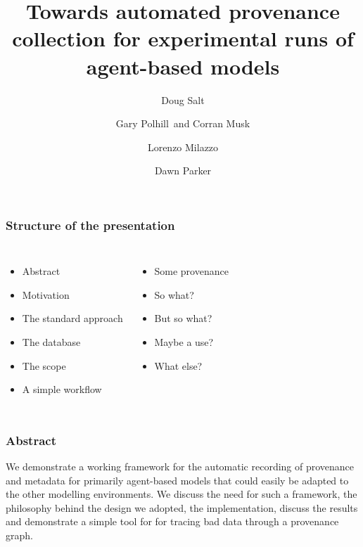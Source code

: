 \documentclass[usenames,dvipsnames,10pt]{beamer}
\title{Towards automated provenance collection for experimental runs of agent-based models}
\author{Doug Salt \and Gary Polhill\ and Corran Musk \and Lorenzo Milazzo \and Dawn Parker}
\institute{The James Hutton Institute}
\begin{document}
\begin{frame}[plain]
    \maketitle
\end{frame}

\begin{frame}
    \frametitle{Structure of the presentation}

    \begin{columns}
            \begin{itemize}
                \item Abstract
                \item Motivation
                \item The standard approach
                \item The database
                \item The scope
                \item A simple workflow
            \end{itemize}
            \begin{itemize}
                \item Some provenance
                \item So what?
                \item But so what?
                \item Maybe a use?
                \item What else?
            \end{itemize}
    \end{columns}
\end{frame}

\begin{frame}
    \frametitle{Abstract}
    We demonstrate a working framework for the automatic recording of
    provenance and metadata for primarily agent-based models that could easily
    be adapted to the other modelling environments. We discuss the need for
    such a framework, the philosophy behind the design we adopted, the
    implementation, discuss the results and demonstrate a simple tool for for
    tracing bad data through a provenance graph.
\end{frame}
\end{document}
